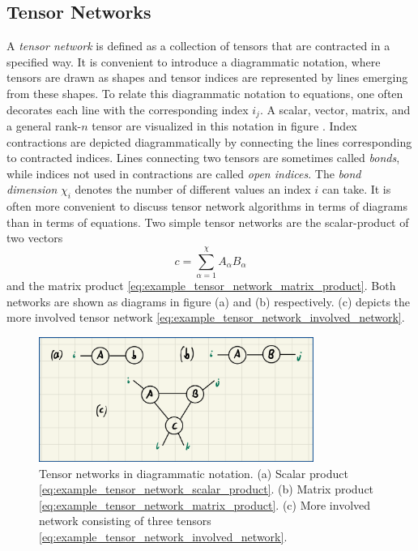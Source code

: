 \subsection*{Tensor Networks}
A \textit{tensor network} is defined as a collection of tensors that are contracted in a specified way. It is convenient to introduce a diagrammatic notation, where tensors are drawn as shapes and tensor indices are represented by lines emerging from these shapes. To relate this diagrammatic notation to equations, one often decorates each line with the corresponding index $i_j$. A scalar, vector, matrix, and a general rank-$n$ tensor are visualized in this notation in figure . Index contractions are depicted diagrammatically by connecting the lines corresponding to contracted indices. Lines connecting two tensors are sometimes called \textit{bonds}, while indices not used in contractions are called \textit{open indices}. The \textit{bond dimension} $\chi_i$ denotes the number of different values an index $i$ can take. It is often more convenient to discuss tensor network algorithms in terms of diagrams than in terms of equations. Two simple tensor networks are the scalar-product of two vectors
\begin{equation}
	\label{eq:example_tensor_network_scalar_product}
	c = \sum_{\alpha=1}^{\chi}A_\alpha B_\alpha
\end{equation}
and the matrix product \eqref{eq:example_tensor_network_matrix_product}. Both networks are shown as diagrams in figure (a) and (b) respectively. (c) depicts the more involved tensor network \eqref{eq:example_tensor_network_involved_network}. \par
\begin{figure}
	\centering
	\includegraphics[width=0.8\textwidth]{figures/Tensor_Networks/basic_tensor_network_diagrams.jpeg}
	\caption{Tensor networks in diagrammatic notation. (a) Scalar product \eqref{eq:example_tensor_network_scalar_product}. (b) Matrix product \eqref{eq:example_tensor_network_matrix_product}. (c) More involved network consisting of three tensors \eqref{eq:example_tensor_network_involved_network}.}
	\label{fig:basic_tensor_network_diagrams}
\end{figure}
